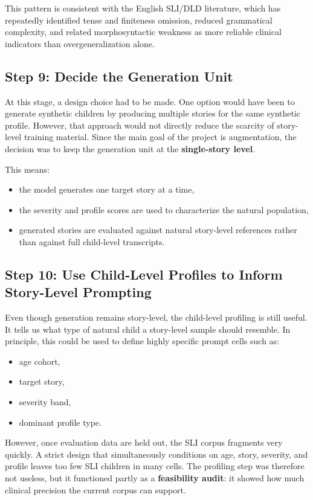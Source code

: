 This pattern is consistent with the English SLI/DLD literature, which has repeatedly identified tense and finiteness omission, reduced grammatical complexity, and related morphosyntactic weakness as more reliable clinical indicators than overgeneralization alone.

\subsection{Step 9: Decide the Generation Unit}

At this stage, a design choice had to be made. One option would have been to generate synthetic children by producing multiple stories for the same synthetic profile. However, that approach would not directly reduce the scarcity of story-level training material. Since the main goal of the project is augmentation, the decision was to keep the generation unit at the \textbf{single-story level}.

This means:

\begin{itemize}
    \item the model generates one target story at a time,
    \item the severity and profile scores are used to characterize the natural population,
    \item generated stories are evaluated against natural story-level references rather than against full child-level transcripts.
\end{itemize}

\subsection{Step 10: Use Child-Level Profiles to Inform Story-Level Prompting}

Even though generation remains story-level, the child-level profiling is still useful. It tells us what type of natural child a story-level sample should resemble. In principle, this could be used to define highly specific prompt cells such as:

\begin{itemize}
    \item age cohort,
    \item target story,
    \item severity band,
    \item dominant profile type.
\end{itemize}

However, once evaluation data are held out, the SLI corpus fragments very quickly. A strict design that simultaneously conditions on age, story, severity, and profile leaves too few SLI children in many cells. The profiling step was therefore not useless, but it functioned partly as a \textbf{feasibility audit}: it showed how much clinical precision the current corpus can support.

